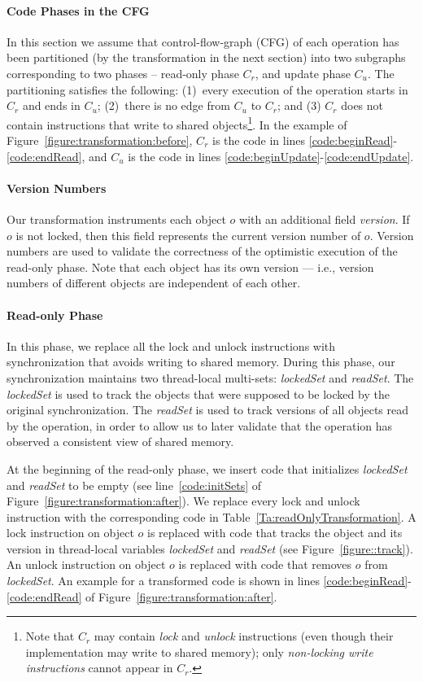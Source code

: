 \paragraph{Code Phases in the CFG}
In this section we assume that
control-flow-graph (CFG) of each operation has been partitioned (by the transformation in the next section)
into two subgraphs corresponding to two phases --
read-only phase $C_r$, and update phase $C_u$. The partitioning satisfies the following:
(1)~every execution of the operation starts in $C_r$ and ends in $C_u$; (2)~there is no edge from $C_u$ to  $C_r$;
and (3) $C_r$ does not contain instructions that write to shared objects\footnote{
Note that $C_r$ may contain \emph{lock} and \emph{unlock} instructions (even though their implementation may write to shared memory);
only \emph{non-locking write instructions} cannot appear in $C_r$.}.
%
In the example of Figure~\ref{figure:transformation:before}, $C_r$ is the code in lines \ref{code:beginRead}-\ref{code:endRead},
and $C_u$ is the code in lines \ref{code:beginUpdate}-\ref{code:endUpdate}.

\paragraph{Version Numbers}
Our transformation instruments each object $o$ with an additional field \emph{version}.
If $o$ is not locked, then this field  represents the current version number of $o$.
Version numbers are used to validate the correctness of the optimistic execution of the read-only phase.
Note that each object has its own version --- i.e., version numbers of different objects are independent of each other.

\paragraph{Read-only Phase}
In this phase, we replace all the lock and unlock instructions with synchronization that avoids writing to shared memory.
During this phase, our synchronization maintains two thread-local multi-sets: \emph{lockedSet} and \emph{readSet}.
The \emph{lockedSet} is used to track the objects that were supposed to be locked by the original synchronization.
%
The \emph{readSet} is used to track versions of all objects read by the
operation, in order to allow us to later validate that the operation has observed a consistent view of shared memory.

At the beginning of the read-only phase, we insert code that initializes \emph{lockedSet} and \emph{readSet} to be empty (see  line~\ref{code:initSets} of Figure~\ref{figure:transformation:after}).
We replace every lock and unlock instruction with the corresponding code in Table~\ref{Ta:readOnlyTransformation}.
A lock instruction on object $o$ is replaced with code that tracks the object and its version in
thread-local variables \emph{lockedSet} and \emph{readSet} (see Figure~\ref{figure::track}).
An unlock instruction on object $o$ is replaced with code that removes $o$ from \emph{lockedSet}.
An example for a transformed code is shown in lines \ref{code:beginRead}-\ref{code:endRead} of Figure~\ref{figure:transformation:after}.

